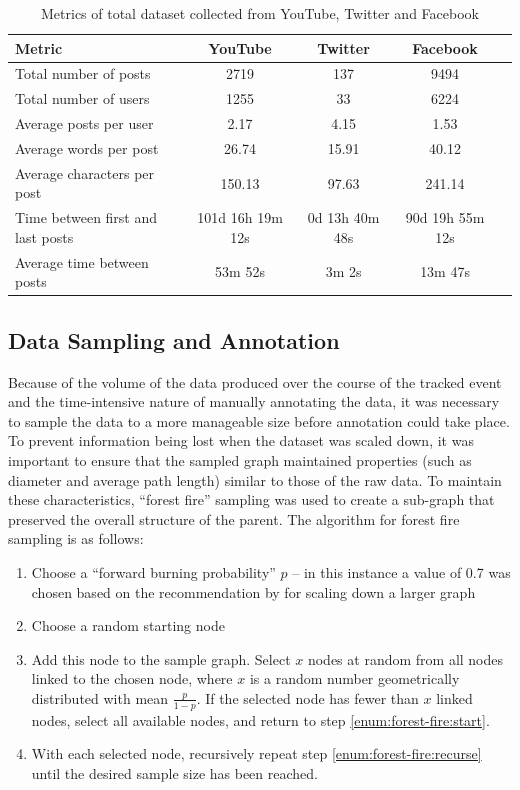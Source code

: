 \begin{table}
\centering
\caption{Metrics of total dataset collected from YouTube, Twitter and Facebook}
\label{table:results:totalstats}
\begin{tabular}{| l | c | c | c | c |}
\hline
\textbf{Metric} & \textbf{YouTube} & \textbf{Twitter} & \textbf{Facebook} \\
\hline
Total number of posts 				& 2719 & 137 & 9494 \\
\hline
Total number of users 				& 1255 & 33 & 6224 \\
\hline
Average posts per user 				& 2.17 & 4.15 & 1.53 \\
\hline
Average words per post 				& 26.74& 15.91 & 40.12  \\
\hline
Average characters per post 		& 150.13 & 97.63 & 241.14 \\
\hline
Time between first and last posts 	& 101d 16h 19m 12s & 0d 13h 40m 48s & 90d 19h 55m 12s\\
\hline
Average time between posts			& 53m 52s & 3m 2s & 13m 47s \\
\hline
\end{tabular}
\end{table}


\subsection{Data Sampling and Annotation}
\label{method:annotation}
Because of the volume of the data produced over the course of the tracked event and the time-intensive nature of manually annotating the data, it was necessary to sample the data to a more manageable size before annotation could take place. To prevent information being lost when the dataset was scaled down, it was important to  ensure that the sampled graph maintained properties (such as diameter and average path length) similar to those of the raw data. To maintain these characteristics, ``forest fire'' sampling \citep{leskovec2005graphs, leskovec2006sampling} was used to create a sub-graph that preserved the overall structure of the parent. The algorithm for forest fire sampling is as follows:
\begin{enumerate}
\item Choose a ``forward burning probability'' $p$ -- in this instance a value of 0.7 was chosen based on the recommendation by \citet{leskovec2006sampling} for scaling down a larger graph

\item Choose a random starting node
\label{enum:forest-fire:start}

\item Add this node to the sample graph. Select $x$ nodes at random from all nodes linked to the chosen node, where $x$ is a random number geometrically distributed with mean $\frac{p}{1-p}$. If the selected node has fewer than $x$ linked nodes, select all available nodes, and return to step \ref{enum:forest-fire:start}.
\label{enum:forest-fire:recurse}

\item With each selected node, recursively repeat step \ref{enum:forest-fire:recurse} until the desired sample size has been reached. 
\end{enumerate}

